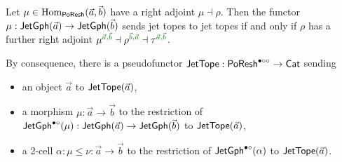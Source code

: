 \documentclass[a4paper]{memoir}
\begin{document}
\begin{theorem} \label{thm:poresh-jettope}
	Let $\mu \in {\mathrm{Hom}}_{\mathsf{PoResh}}(\vec a, \vec b)$ have a right adjoint $\mu \dashv \rho$.
	Then the functor $\mu : \mathsf{JetGph}(\vec a) \to \mathsf{JetGph}(\vec b)$ sends jet topes to jet topes if and only if $\rho$ has a further right adjoint $\mu\pmrhom{\vec a}{\vec b} \dashv \rho\pmrhom{\vec b}{\vec a} \dashv \tau\pmrhom{\vec a}{\vec b}$.
	
	By consequence, there is a pseudofunctor $\mathsf{JetTope} : \mathsf{PoResh}^{\bullet \circ \circ} \to {\mathsf{Cat}}$ sending
	\begin{itemize}
		\item an object $\vec a$ to $\mathsf{JetTope}(\vec a)$,
		\item a morphism $\mu : \vec a \to \vec b$ to the restriction of $\mathsf{JetGph}^{\bullet \circ}(\mu) : \mathsf{JetGph}(\vec a) \to \mathsf{JetGph}(\vec b)$ to $\mathsf{JetTope}(\vec a)$,
		\item a 2-cell $\alpha : \mu \leq \nu : \vec a \to \vec b$ to the restriction of $\mathsf{JetGph}^{\bullet \circ}(\alpha)$ to $\mathsf{JetTope}(\vec a)$.
	\end{itemize}
\end{theorem}
\end{document}
